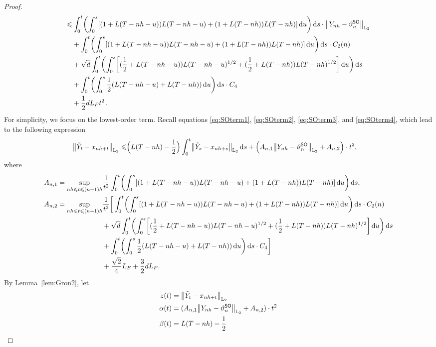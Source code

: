 \begin{proof}
\begin{equation}
\begin{aligned}
        \leqslant& \int_0^t\left(\int_0^s\left[(1+L(T-nh-u))L(T-nh-u)+(1+L(T-nh))L(T-nh)\right]\rmd u\right)\rmd s\cdot \l|Y_{nh}-\vartheta_n^{\sf SO}\r|_{\Ltwo}\\
        &+\int_0^t\left(\int_0^s\left[(1+L(T-nh-u))L(T-nh-u)+(1+L(T-nh))L(T-nh)\right]\rmd u\right)\rmd s\cdot C_2(n)\\
        &+\sqrt{d}\int_0^t\left(\int_0^s\left[(\dfrac{1}{2}+L(T-nh-u))L(T-nh-u)^{1/2}+(\dfrac{1}{2}+L(T-nh))L(T-nh)^{1/2}\right]\rmd u\right)\rmd s\\
        &+\int_0^t\left(\int_0^s\dfrac{1}{2}(L(T-nh-u)+L(T-nh))\rmd u\right)\rmd s\cdot C_4\\
        &+\dfrac{1}{2}dL_Ft^2\,.   \label{eq:SOterm4}
    \end{aligned}
\end{equation}
For simplicity, we focus on the lowest-order term. Recall equations \eqref{eq:SOterm1}, \eqref{eq:SOterm2}, \eqref{eq:SOterm3}, and \eqref{eq:SOterm4}, which lead to the following expression
\begin{align*}
    \l|\tilde{Y}_t-x_{nh+t}\r|_{\Ltwo}\leqslant& \Big(L(T-nh)-\dfrac{1}{2}\Big)\int_0^t\l|\tilde{Y}_s-x_{nh+s}\r|_{\Ltwo}\rmd s+\Big(A_{n,1}\l|Y_{nh}-\vartheta_n^{\sf SO}\r|_{\Ltwo}+A_{n,2}\Big)\cdot t^2,
\end{align*}
where
\begin{align*}
    A_{n,1}=\sup_{nh\leqslant t\leqslant (n+1)h}&\dfrac{1}{t^2}\int_0^t\left(\int_0^s\left[(1+L(T-nh-u))L(T-nh-u)+(1+L(T-nh))L(T-nh)\right]\rmd u\right)\rmd s,\\
    A_{n,2}=\sup_{nh\leqslant t\leqslant (n+1)h}&\dfrac{1}{t^2}\bigg[\int_0^t\left(\int_0^s\left[(1+L(T-nh-u))L(T-nh-u)+(1+L(T-nh))L(T-nh)\right]\rmd u\right)\rmd s\cdot C_2(n)\\
    &+\sqrt{d}\int_0^t\left(\int_0^s\left[(\dfrac{1}{2}+L(T-nh-u))L(T-nh-u)^{1/2}+(\dfrac{1}{2}+L(T-nh))L(T-nh)^{1/2}\right]\rmd u\right)\rmd s\\
    &+\int_0^t\left(\int_0^s\dfrac{1}{2}(L(T-nh-u)+L(T-nh))\rmd u\right)\rmd s\cdot C_4\bigg]\\
    &+\dfrac{\sqrt{2}}{4}L_F+\dfrac{3}{2}dL_F.
\end{align*}
By Lemma~\ref{lem:Gron2}, let
\begin{align*}
    z(t)&=\l|\tilde Y_t-x_{nh+t}\r|_{\Ltwo}\\
    \alpha(t)&=(A_{n,1}\l|Y_{nh}-\vartheta_n^{\sf SO}\r|_{\Ltwo}+A_{n,2})\cdot t^2\\
    \beta(t)&=L(T-nh)-\dfrac{1}{2}
\end{align*}

\end{proof}

